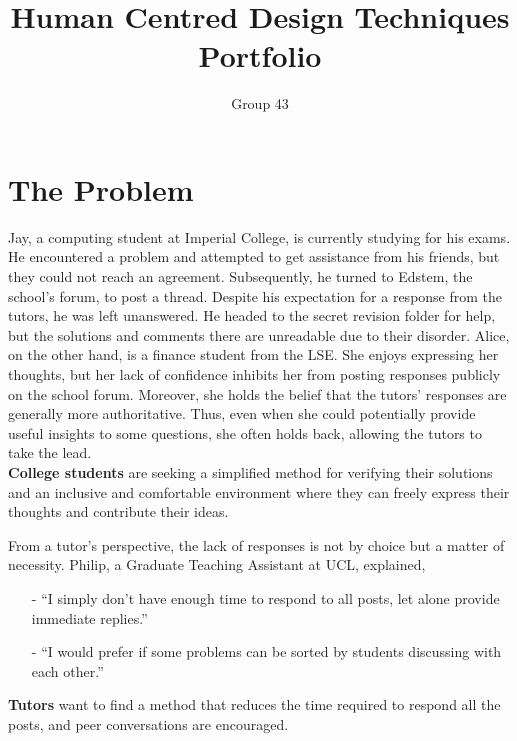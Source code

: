 \documentclass[a4paper]{article}
\begin{document}
    \title{
        \vspace{-3em}
        Human Centred Design Techniques Portfolio}
    \author{
        Group 43
    }
    \date{\vspace{-2em}}
    \maketitle

    \section*{The Problem}

    \noindent Jay, a computing student at Imperial College, is currently studying for his exams.
    He encountered a problem and attempted to get assistance from his friends, but they could not reach an agreement.
    Subsequently, he turned to Edstem, the school’s forum, to post a thread.
    Despite his expectation for a response from the tutors, he was left unanswered.
    He headed to the secret revision folder for help, but the solutions and comments there are unreadable due to their disorder.
    Alice, on the other hand, is a finance student from the LSE. She enjoys expressing her thoughts, but her lack of confidence inhibits her from posting responses publicly on the school forum.
    Moreover, she holds the belief that the tutors' responses are generally more authoritative.
    Thus, even when she could potentially provide useful insights to some questions, she often holds back, allowing the tutors to take the lead.\\
    \textbf{College students} are seeking a simplified method for verifying their solutions and an inclusive and comfortable environment where they can freely express their thoughts and contribute their ideas.

    From a tutor's perspective, the lack of responses is not by choice but a matter of necessity.
    Philip, a Graduate Teaching Assistant at UCL, explained,
    \begin{itemize}
        \item[-] ``I simply don't have enough time to respond to all posts, let alone provide immediate replies.''
        \item[-] ``I would prefer if some problems can be sorted by students discussing with each other.''
    \end{itemize}
    \textbf{Tutors} want to find a method that reduces the time required to respond all the posts, and peer conversations are encouraged.
\end{document}
